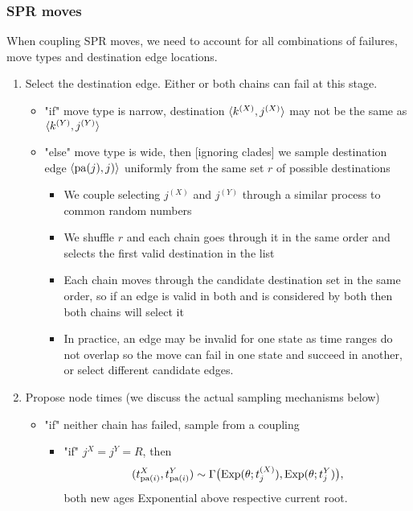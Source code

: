 \documentclass[11pt,a4paper]{article}
\begin{document}
\subsubsection{SPR moves}

When coupling SPR moves, we need to account for all combinations of failures, move types and destination edge locations.
\begin{enumerate}
    \item Select the destination edge. Either or both chains can fail at this stage.
    \begin{itemize}
        \item "if" move type is narrow, destination $ \langle k^{(X)}, j^{(X)}\rangle $ may not be the same as $ \langle k^{(Y)}, j^{(Y)}\rangle $
        \item "else" move type is wide, then [ignoring clades] we sample destination edge $ \langle\operatorname*{\mathrm{pa}}(j), j)\rangle $ uniformly from the same set $ r $ of possible destinations
        \begin{itemize}
            \item We couple selecting $ j^{(X)} $ and $ j^{(Y)} $ through a similar process to common random numbers
            \item We shuffle $ r $ and each chain goes through it in the same order and selects the first valid destination in the list
            \item Each chain moves through the candidate destination set in the same order, so if an edge is valid in both and is considered by both then both chains will select it
            \item In practice, an edge may be invalid for one state as time ranges do not overlap so the move can fail in one state and succeed in another, or select different candidate edges.
        \end{itemize}
    \end{itemize}
    \item Propose node times (we discuss the actual sampling mechanisms below)
    \begin{itemize}
        \item "if" neither chain has failed, sample from a coupling
        \begin{itemize}
            \item "if" $ j^{X} = j^{Y} = R $, then
            \[
                (t_{\operatorname*{\mathrm{pa}}(i)}^{X}, t_{\operatorname*{\mathrm{pa}}(i)}^{Y}) \sim \Gamma\big(\mathrm{Exp}(\theta; t_j^{(X)}), \mathrm{Exp}(\theta; t_j^{Y})\big),
            \]
            both new ages Exponential above respective current root.

\end{itemize}
\end{itemize}
\end{enumerate}
\end{document}
